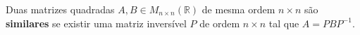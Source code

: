 \begin{definition}
	Duas matrizes quadradas $A,B\in M_{n\times n}(\mathbb{R})$ de mesma ordem $n\times n$ são \textbf{similares} se existir uma matriz inversível $P$ de ordem $n\times n$ tal que $A=PBP^{-1}$.
\end{definition}